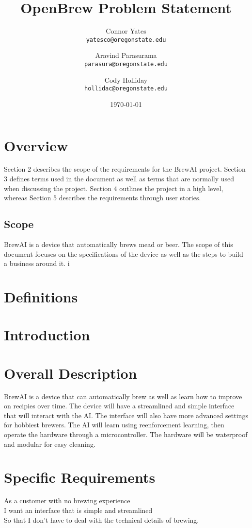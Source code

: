 \documentclass[letterpaper,10pt]{article}
\author{Connor Yates\\
\texttt{yatesco@oregonstate.edu}
\and
Aravind Parasurama\\
\texttt{parasura@oregonstate.edu}
\and
Cody Holliday\\
\texttt{hollidac@oregonstate.edu}}
\date{\today}
\title{OpenBrew Problem Statement}
\begin{document}
\maketitle

\newpage

\section{Overview}
Section 2 describes the scope of the requirements for the BrewAI project.
Section 3 defines terms used in the document as well as terms that are normally used when discussing the project.
Section 4 outlines the project in a high level, whereas Section 5 describes the requirements through user stories.

\subsection{Scope}
BrewAI is a device that automatically brews mead or beer.
The scope of this document focuses on the specifications of the device as well as the steps to build a business around it.
i

\section{Definitions}

\section{Introduction}
\section{Overall Description}
BrewAI is a device that can automatically brew as well as learn how to improve on recipies over time.
The device will have a streamlined and simple interface that will interact with the AI.
The interface will also have more advanced settings for hobbiest brewers.
The AI will learn using reenforcement learning, then operate the hardware through a microcontroller.
The hardware will be waterproof and modular for easy cleaning.

\section{Specific Requirements}
As a customer with no brewing experience\\
I want an interface that is simple and streamlined\\
So that I don't have to deal with the technical details of brewing.\\
\end{document}

